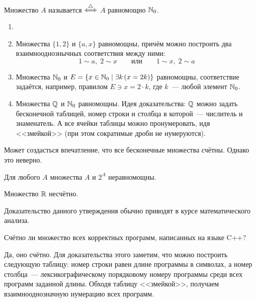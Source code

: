 \begin{definition}
    Множество $ A $ называется  $ \overset{\triangle}{\Longleftrightarrow} $ $ A $ равномощно $ \mathbb{N}_0 $.
\end{definition}

\begin{example}
    \begin{enumerate}
        \item[]
        \item
            Множества $ \{1, 2\} $ и $ \{a, x\} $ равномощны, причём можно построить два взаимнооднознычных соответствия между ними:
            \[
                1 \sim a, \; 2 \sim x \qquad \text{или} \qquad 1 \sim x, \; 2 \sim a
            \]
        \item
            Множества $ \mathbb{N}_0 $ и $ E = \{ x \in \mathbb{N}_0 \mid \exists k \, (x = 2k) \} $ равномощны, соответствие задаётся, например, правилом $ E \ni x = 2 \cdot k $, где $ k $~--- любой элемент $ \mathbb{N}_0 $.
        \item
            Множества $ \mathbb{Q} $ и $ \mathbb{N}_0 $ равномощны.
            Идея доказательства: $ \mathbb{Q} $ можно задать бесконечной таблицей, номер строки и столбца в которой~--- числитель и знаменатель.
            А все ячейки таблицы можно пронумеровать, идя <<змейкой>> (при этом сократимые дроби не нумеруются).
    \end{enumerate}
\end{example}

Может создасться впечатление, что все бесконечные множества счётны.
Однако это неверно.

\begin{theorem}[Кантора]
    Для любого $ A $ множества $ A $ и $ 2^A $ неравномощны.
\end{theorem}

\begin{statement}
    Множество $ \mathbb{R} $ несчётно.
\end{statement}

Доказательство данного утверждения обычно приводят в курсе математического анализа.

\begin{Exercise}[counter=SecExercise]
    \noindent
    Счётно ли множество всех корректных программ, написанных на языке C++?
\end{Exercise}

\begin{Answer}
    \noindent
    Да, оно счётно.
    Для доказательства этого заметим, что можно построить следующую таблицу:
    номер строки равен длине программы в символах, а номер столбца~--- лексикографическому порядковому номеру программы среди всех программ заданной длины.
    Обходя таблицу <<змейкой>>, получаем взаимнооднозначную нумерацию всех программ.
\end{Answer}
\fi
